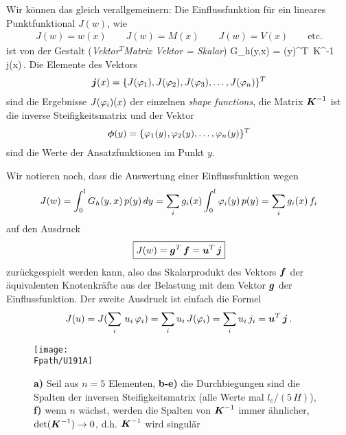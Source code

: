 Wir k\"{o}nnen das gleich verallgemeinern: Die Einflussfunktion f\"{u}r ein lineares Punktfunktional $J(w)$, wie
\begin{align}
J(w) = w(x) \qquad J(w) = M(x) \qquad J(w) = V(x) \qquad \text{etc.}
\end{align}
ist von der Gestalt ({\em Vektor$^T$Matrix Vektor = Skalar})
\beq
G_h(y,x) = \vek \phi(y)^T\, \vek K^{-1}\,\vek j(x)\,.
\eeq
Die Elemente des Vektors
\begin{align}
\mbox{\boldmath $j$}(x) =  \{J(\varphi_1), J(\varphi_2), J(\varphi_3), \ldots, J(\varphi_n) \}^T
\end{align}
sind die Ergebnisse $J(\varphi_i)(x)$ der einzelnen {\em shape functions\/}, die Matrix $\mbox{\boldmath $K$}^{-1}$ ist die inverse Steifigkeitsmatrix und der Vektor
\begin{align}
\mbox{\boldmath $\phi$}(y) = \{\varphi_1(y), \varphi_2(y), \ldots, \varphi_n(y)\}^T
\end{align}
sind die Werte der Ansatzfunktionen im Punkt $y$.

Wir notieren noch, dass die Auswertung einer Einflussfunktion wegen
\begin{align}
J(w) = \int_{0}^{l}G_h(y,x)\,p(y)\,dy = \sum_i g_i(x)\int_{0}^{l}\varphi_i(y)\,p(y) = \sum_i g_i(x)\,f_i
\end{align}
auf den Ausdruck
\begin{align}
\boxed{ J(w) = \mbox{\boldmath $g$}^T\,\mbox{\boldmath $f$} = \mbox{\boldmath $u$}^T\,\mbox{\boldmath $j$}}
\end{align}
zur\"{u}ckgespielt werden kann, also das Skalarprodukt des Vektors $\mbox{\boldmath $f$}$ der \"{a}quivalenten Knotenkr\"{a}fte aus der Belastung mit dem Vektor $\mbox{\boldmath $g$}$ der Einflussfunktion. Der zweite Ausdruck ist einfach die  Formel
\begin{align}
J(u) = J(\sum_i\,u_i\,\varphi_i) = \sum_i u_i\,J(\varphi_i) =  \sum_i u_i\,j_i = \mbox{\boldmath $u$}^T\,\mbox{\boldmath $j$}\,.
\end{align}

\begin{figure}
\centering
{\texttt{[image: \\Fpath/U191A]}}
  \caption{\textbf{ a)} Seil aus $n = 5$ Elementen, \textbf{ b-e)} die Durchbiegungen sind die Spalten der inversen Steifigkeitsmatrix (alle Werte mal $l_e/(5\,H)$), \textbf{ f)} wenn $n$ w\"{a}chst, werden die Spalten von $\mbox{\boldmath $K$}^{-1}$ immer \"{a}hnlicher, $\det(\mbox{\boldmath $K$}^{-1}) \to 0$, d.h. $\mbox{\boldmath $K$}^{-1}$ wird singul\"{a}r}\label{Korrektur6}
  \label{U191}
\end{figure}

